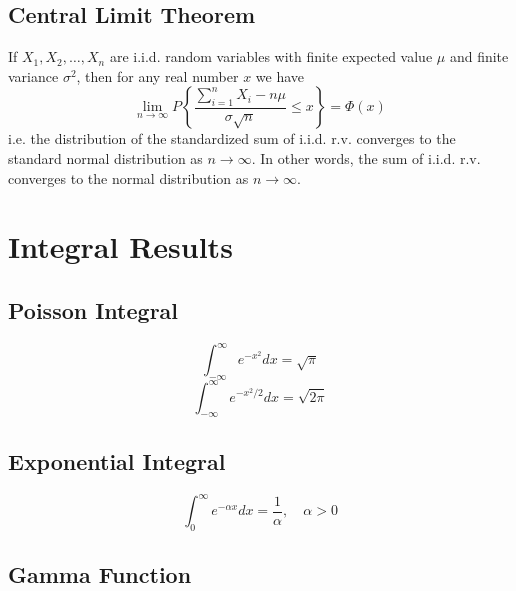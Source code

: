\documentclass{template}
\begin{document}
\subsection{Central Limit Theorem}
\begin{theorem}
	If $X_1, X_2, \ldots, X_n$ are i.i.d. random variables with finite expected
	value $\mu$ and finite variance $\sigma^2$, then for any real number $x$ we have
	\[
		\lim_{n \to \infty} P\left\{\frac{\sum_{i=1}^{n} X_i - n\mu}{\sigma\sqrt{n}} \leq x\right\} = \Phi(x)
	\] 
	i.e. the distribution of the standardized sum of i.i.d. r.v. converges to the standard normal distribution as $n \to \infty$.
	In other words, the sum of i.i.d. r.v. converges to the normal distribution as $n \to \infty$.
\end{theorem}

\section{Integral Results}
\subsection{Poisson Integral}
\[
	\int_{-\infty}^{\infty} e^{-x^2} dx = \sqrt{\pi}
\] 
\[
	\int_{-\infty}^{\infty} e^{-x^2/2} dx = \sqrt{2\pi}
\] 
\subsection{Exponential Integral}
\[
	\int_{0}^{\infty} e^{-\alpha x} dx = \frac{1}{\alpha}, \quad \alpha > 0
\] 

\subsection{Gamma Function}
\end{document}
